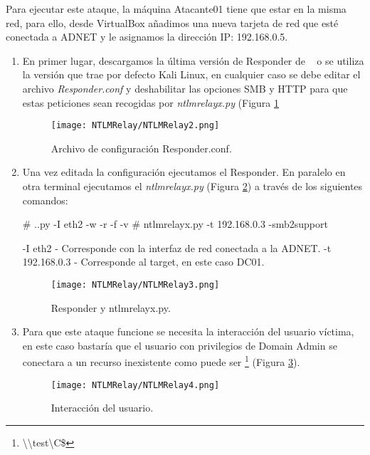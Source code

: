 Para ejecutar este ataque, la máquina Atacante01 tiene que estar en la misma red, para ello, desde VirtualBox añadimos una nueva tarjeta de red que esté conectada a ADNET y le asignamos la dirección IP: 192.168.0.5.

\begin{enumerate}

\item En primer lugar, descargamos la última versión de Responder de ~\cite{Capitulo5:Responder} o se utiliza la versión que trae por defecto Kali Linux, en cualquier caso se debe editar el archivo {\it Responder.conf} y deshabilitar las opciones SMB y HTTP para que estas peticiones sean recogidas por {\it ntlmrelayx.py} (Figura \ref{NTLMRelay2}
\begin{figure}[H] %
\begin{center}
\texttt{[image: NTLMRelay/NTLMRelay2.png]}
\end{center}
\caption{Archivo de configuración Responder.conf.}
\label{NTLMRelay2}
\end{figure}

\item Una vez editada la configuración ejecutamos el Responder. En paralelo en otra terminal ejecutamos el {\it ntlmrelayx.py} (Figura \ref{NTLMRelay3}) a través de los siguientes comandos:

\begin{listing}[style=consola, numbers=none]
# .\Responder.py -I eth2 -w -r -f -v
# ntlmrelayx.py -t 192.168.0.3 -smb2support
\end{listing}

-I eth2 - Corresponde con la interfaz de red conectada a la ADNET.
-t 192.168.0.3 - Corresponde al target, en este caso DC01. 

\begin{figure}[H] %
\begin{center}
\texttt{[image: NTLMRelay/NTLMRelay3.png]}
\end{center}
\caption{Responder y ntlmrelayx.py.}
\label{NTLMRelay3}
\end{figure}

\item Para que este ataque funcione se necesita la interacción del usuario víctima, en este caso bastaría que el usuario con privilegios de Domain Admin se conectara a un recurso inexistente como puede ser \footnote{\textbackslash{}\textbackslash{}test\textbackslash{}C\$} (Figura \ref{NTLMRelay4}).
\begin{figure}[H] %
\begin{center}
\texttt{[image: NTLMRelay/NTLMRelay4.png]}
\end{center}
\caption{Interacción del usuario.}
\label{NTLMRelay4}
\end{figure}


\end{enumerate}
